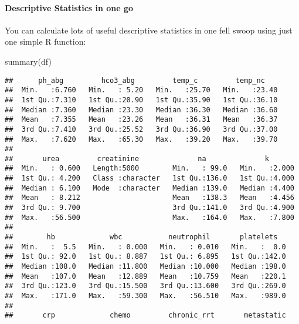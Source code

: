\documentclass[
]{article}
\newenvironment{Shaded}{\begin{snugshade}}{\end{snugshade}}
\newcommand{\FunctionTok}[1]{\textcolor[rgb]{0.00,0.00,0.00}{#1}}
\newcommand{\NormalTok}[1]{#1}
\begin{document}
\hypertarget{descriptive-statistics-in-one-go}{%
\paragraph{Descriptive Statistics in one
go}\label{descriptive-statistics-in-one-go}}

You can calculate lots of useful descriptive statistics in one fell
swoop using just one simple R function:

\begin{Shaded}
\begin{Highlighting}[]
\FunctionTok{summary}\NormalTok{(df)}
\end{Highlighting}
\end{Shaded}

\begin{verbatim}
##      ph_abg         hco3_abg         temp_c         temp_nc     
##  Min.   :6.760   Min.   : 5.20   Min.   :25.70   Min.   :23.40  
##  1st Qu.:7.310   1st Qu.:20.90   1st Qu.:35.90   1st Qu.:36.10  
##  Median :7.360   Median :23.30   Median :36.30   Median :36.60  
##  Mean   :7.355   Mean   :23.26   Mean   :36.31   Mean   :36.37  
##  3rd Qu.:7.410   3rd Qu.:25.52   3rd Qu.:36.90   3rd Qu.:37.00  
##  Max.   :7.620   Max.   :65.30   Max.   :39.20   Max.   :39.70  
##                                                                 
##       urea         creatinine              na              k        
##  Min.   : 0.600   Length:5000        Min.   : 99.0   Min.   :2.000  
##  1st Qu.: 4.200   Class :character   1st Qu.:136.0   1st Qu.:4.000  
##  Median : 6.100   Mode  :character   Median :139.0   Median :4.400  
##  Mean   : 8.212                      Mean   :138.3   Mean   :4.456  
##  3rd Qu.: 9.700                      3rd Qu.:141.0   3rd Qu.:4.900  
##  Max.   :56.500                      Max.   :164.0   Max.   :7.800  
##                                                                     
##        hb             wbc           neutrophil       platelets    
##  Min.   :  5.5   Min.   : 0.000   Min.   : 0.010   Min.   :  0.0  
##  1st Qu.: 92.0   1st Qu.: 8.887   1st Qu.: 6.895   1st Qu.:142.0  
##  Median :108.0   Median :11.800   Median :10.000   Median :198.0  
##  Mean   :107.0   Mean   :12.889   Mean   :10.759   Mean   :220.1  
##  3rd Qu.:123.0   3rd Qu.:15.500   3rd Qu.:13.600   3rd Qu.:269.0  
##  Max.   :171.0   Max.   :59.300   Max.   :56.510   Max.   :989.0  
##                                                                   
##       crp             chemo         chronic_rrt       metastatic    

\end{verbatim}
\end{document}
